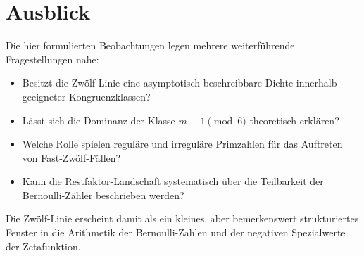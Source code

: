 \documentclass[11pt,a4paper]{article}
\theoremstyle{definition}
\theoremstyle{plain}
\theoremstyle{remark}
\begin{document}
	\section{Ausblick}
	
	Die hier formulierten Beobachtungen legen mehrere weiterführende Fragestellungen nahe:
	
	\begin{itemize}
		\item Besitzt die Zwölf-Linie eine asymptotisch beschreibbare Dichte innerhalb geeigneter Kongruenzklassen?
		\item Lässt sich die Dominanz der Klasse $m\equiv 1\pmod 6$ theoretisch erklären?
		\item Welche Rolle spielen reguläre und irreguläre Primzahlen für das Auftreten von Fast-Zwölf-Fällen?
		\item Kann die Restfaktor-Landschaft systematisch über die Teilbarkeit der Bernoulli-Zähler beschrieben werden?
	\end{itemize}
	
	Die Zwölf-Linie erscheint damit als ein kleines, aber bemerkenswert strukturiertes Fenster in die Arithmetik der Bernoulli-Zahlen und der negativen Spezialwerte der Zetafunktion.
	
\end{document}
